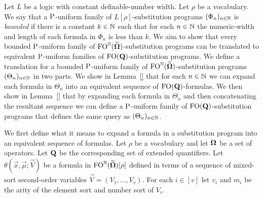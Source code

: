 \documentclass[../main/thesis.tex]{subfiles}
\begin{document}


Let $L$ be a logic with constant definable-number width. Let $\rho$ be a
vocabulary. We say that a $\mathrm{P}$-uniform family of $L[\rho]$-substitution
programs $(\Phi_n)_{n \in \mathbb{N}}$ is \emph{bounded} if there is a constant $k
\in \mathbb{N}$ such that for each $n \in \mathbb{N}$ the numeric-width and length of each
formula in $\Phi_n$ is less than $k$. We aim to show that every bounded
$\mathrm{P}$-uniform family of $\text{\upshape FO}^{\mathbb{N}} (\widetilde{\mathbf{\mathbf{\Omega}}})$-substitution programs
can be translated to equivalent $\mathrm{P}$-uniform families of
$\text{\upshape FO}(\mathbf{Q})$-substitution programs. We define a translation for a bounded
$\mathrm{P}$-uniform family of $\text{\upshape FO}^{\mathbb{N}} (\widetilde{\mathbf{\mathbf{\Omega}}})$-substitution programs
$(\Theta_n)_{n \in \mathbb{N}}$ in two parts. We show in Lemma~\ref{} that for each
$n \in \mathbb{N}$ we can expand each formula in $\Theta_n$ into an equivalent
sequence of $\text{\upshape FO}(\mathbf{Q})$-formulas. We then show in Lemma~\ref{} that by
expanding each formula in $\Theta_n$ and then concatenating the resultant
sequence we can define a $\mathrm{P}$-uniform family of $\text{\upshape FO}(\mathbf{Q})$-substitution
programs that defines the same query as $(\Theta_n)_{n \in \mathbb{N}}$.

We first define what it means to expand a formula in a substitution program into
an equivalent sequence of formulas. Let $\rho$ be a vocabulary and let $\mathbf{\mathbf{\Omega}}$
be a set of operators. Let $\mathbf{Q}$ be the corresponding set of extended
quantifiers. Let $\theta (\vec{x}, \vec{\mu}; \vec{V})$ be a formula in
$\text{\upshape FO}^{\mathbb{N}} (\widetilde{\mathbf{\mathbf{\Omega}}})[\rho]$ defined in terms of a sequence of
mixed-sort second-order variables $\vec{V} = (V_1, \ldots, V_v)$. For each $i
\in [v]$ let $v_i$ and $m_i$ be the arity of the element sort and number sort of
$V_i$.
\end{document}
